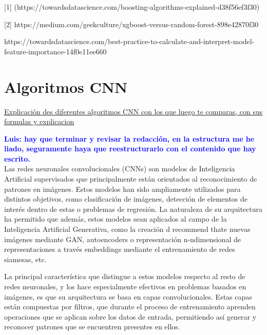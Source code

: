 \documentclass{uathesis-es}
\begin{document}
[1] (https://towardsdatascience.com/boosting-algorithms-explained-d38f56ef3f30)

[2] https://medium.com/geekculture/xgboost-versus-random-forest-898e42870f30


https://towardsdatascience.com/best-practice-to-calculate-and-interpret-model-feature-importance-14f0e11ee660




\section{Algoritmos CNN}

\underline{Explicación des diferentes algoritmos CNN con los que luego te comparas, con sus formulas y explicacion}

\textcolor{blue}{\textbf{Luis: hay que terminar y revisar la redacción, en la estructura me he liado, seguramente haya que reestructurarlo con el contenido que hay escrito.}}\\


Las redes neuronales convolucionales (CNNs) son modelos de Inteligencia Artificial supervisados que principalmente están orientados al reconocimiento de patrones en imágenes. Estos modelos han sido ampliamente utilizados para distintos objetivos, como clasificación de imágenes, detección de elementos de interés dentro de estas o problemas de regresión. La naturaleza de su arquitectura ha permitido que además, estos modelos sean aplicados al campo de la Inteligencia Artificial Generativa, como la creación d recommend thate nuevas imágenes mediante GAN, autoencoders o representación n-ndimensional de representaciones a través embeddings mediante el entrenamiento de redes siamesas, etc.

La principal característica que distingue a estos modelos respecto al resto de redes neuronales, y los hace especialmente efectivos en problemas basados en imágenes, es que su arquitectura se basa en capas convolucionales. Estas capas están compuestas por filtros, que durante el proceso de entrenamiento aprenden operaciones que se aplican sobre los datos de entrada, permitiendo así generar y reconocer patrones que se encuentren presentes en ellos.
\end{document}
